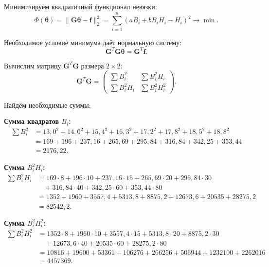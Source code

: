 \documentclass{article}
\begin{document}
Минимизируем квадратичный функционал невязки:
\begin{equation}
\Phi(\boldsymbol{\theta}) = \|\mathbf{G}\boldsymbol{\theta} - \mathbf{f}\|_2^2 = \sum_{i=1}^{8} (a B_i + b B_i H_i - H_i)^2 \to \min.
\end{equation}

Необходимое условие минимума даёт нормальную систему:
\begin{equation}
\mathbf{G}^T \mathbf{G} \boldsymbol{\theta} = \mathbf{G}^T \mathbf{f}.
\label{eq:44_normal}
\end{equation}

Вычислим матрицу $\mathbf{G}^T \mathbf{G}$ размера $2 \times 2$:
\begin{equation}
\mathbf{G}^T \mathbf{G} =
\begin{pmatrix}
\sum B_i^2 & \sum B_i^2 H_i \\
\sum B_i^2 H_i & \sum B_i^2 H_i^2
\end{pmatrix}.
\end{equation}

Найдём необходимые суммы:

\textbf{Сумма квадратов $B_i$:}
\begin{align}
\sum B_i^2 &= 13{,}0^2 + 14{,}0^2 + 15{,}4^2 + 16{,}3^2 + 17{,}2^2 + 17{,}8^2 + 18{,}5^2 + 18{,}8^2 \nonumber \\
&= 169 + 196 + 237{,}16 + 265{,}69 + 295{,}84 + 316{,}84 + 342{,}25 + 353{,}44 \nonumber \\
&= 2176{,}22.
\end{align}

\textbf{Сумма $B_i^2 H_i$:}
\begin{align}
\sum B_i^2 H_i &= 169 \cdot 8 + 196 \cdot 10 + 237{,}16 \cdot 15 + 265{,}69 \cdot 20 + 295{,}84 \cdot 30 \nonumber \\
&\quad + 316{,}84 \cdot 40 + 342{,}25 \cdot 60 + 353{,}44 \cdot 80 \nonumber \\
&= 1352 + 1960 + 3557{,}4 + 5313{,}8 + 8875{,}2 + 12673{,}6 + 20535 + 28275{,}2 \nonumber \\
&= 82542{,}2.
\end{align}

\textbf{Сумма $B_i^2 H_i^2$:}
\begin{align}
\sum B_i^2 H_i^2 &= 1352 \cdot 8 + 1960 \cdot 10 + 3557{,}4 \cdot 15 + 5313{,}8 \cdot 20 + 8875{,}2 \cdot 30 \nonumber \\
&\quad + 12673{,}6 \cdot 40 + 20535 \cdot 60 + 28275{,}2 \cdot 80 \nonumber \\
&= 10816 + 19600 + 53361 + 106276 + 266256 + 506944 + 1232100 + 2262016 \nonumber \\
&= 4457369.
\end{align}
\end{document}
